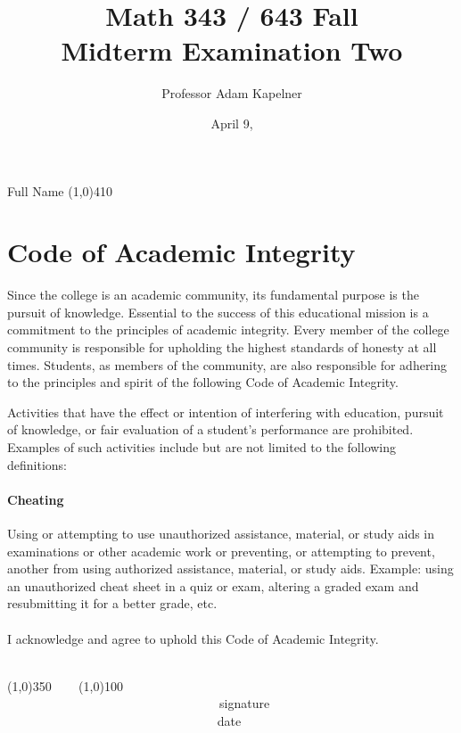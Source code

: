\documentclass[12pt]{article}
\title{Math 343 / 643 Fall \the\year{} \\ Midterm Examination Two \inred{Solutions}}
\author{Professor Adam Kapelner}
\date{April 9, \the\year{}}
\begin{document}
\maketitle

\noindent Full Name \line(1,0){410}

\thispagestyle{empty}

\section*{Code of Academic Integrity}

\footnotesize
Since the college is an academic community, its fundamental purpose is the pursuit of knowledge. Essential to the success of this educational mission is a commitment to the principles of academic integrity. Every member of the college community is responsible for upholding the highest standards of honesty at all times. Students, as members of the community, are also responsible for adhering to the principles and spirit of the following Code of Academic Integrity.

Activities that have the effect or intention of interfering with education, pursuit of knowledge, or fair evaluation of a student's performance are prohibited. Examples of such activities include but are not limited to the following definitions:

\paragraph{Cheating} Using or attempting to use unauthorized assistance, material, or study aids in examinations or other academic work or preventing, or attempting to prevent, another from using authorized assistance, material, or study aids. Example: using an unauthorized cheat sheet in a quiz or exam, altering a graded exam and resubmitting it for a better grade, etc.\\
\\
\noindent I acknowledge and agree to uphold this Code of Academic Integrity. \\~\\

\begin{center}
\line(1,0){350} ~~~ \line(1,0){100}\\
~~~~~~~~~~~~~~~~~~~~~~~~~~~~~~~~~~signature~~~~~~~~~~~~~~~~~~~~~~~~~~~~~~~~~~~~~~~~~~~~~~~~~~~~~~~~~~~~~~ date
\end{center}

\normalsize
\end{document}
